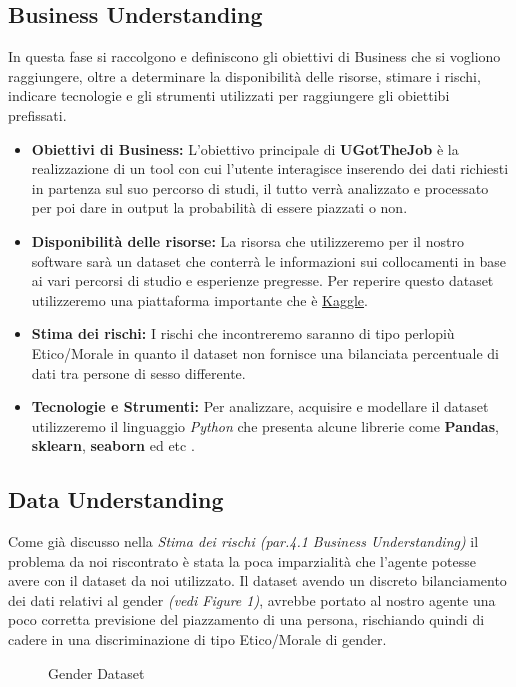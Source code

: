 \documentclass[12pt]{article}
\newcommand{\mainname}{UGotTheJob}
\begin{document}
\newpage

\subsection{Business Understanding}
In questa fase si raccolgono e definiscono gli obiettivi di Business che si vogliono raggiungere, oltre a determinare
la disponibilità delle risorse, stimare i rischi, indicare tecnologie e gli strumenti utilizzati per raggiungere gli obiettibi
prefissati.

\begin{itemize}
    \item \textbf{Obiettivi di Business:} L'obiettivo principale di \textbf{\mainname} è la realizzazione di un tool con cui l'utente interagisce inserendo
          dei dati richiesti in partenza sul suo percorso di studi, il tutto verrà analizzato e processato per poi dare in
          output la probabilità di essere piazzati o non. 

    \item \textbf{Disponibilità delle risorse:} La risorsa che utilizzeremo per il nostro software sarà un dataset che conterrà
          le informazioni sui collocamenti in base ai vari percorsi di studio e esperienze pregresse. Per reperire questo dataset utilizzeremo una piattaforma importante che è \href{https://www.kaggle.com/}{Kaggle}.

    \item \textbf{Stima dei rischi:} I rischi che incontreremo saranno di tipo perlopiù Etico/Morale in quanto il dataset non fornisce una bilanciata percentuale di dati tra persone di
          sesso differente.

    \item \textbf{Tecnologie e Strumenti:} Per analizzare, acquisire e modellare il dataset utilizzeremo il linguaggio \textit{Python} che presenta alcune librerie come \textbf{Pandas}, \textbf{sklearn}, \textbf{seaborn} ed etc .

\end{itemize}

\subsection{Data Understanding}
Come già discusso nella \textit{Stima dei rischi (par.4.1 Business Understanding)} il problema da noi riscontrato è stata la poca imparzialità che l'agente potesse avere
con il dataset da noi utilizzato. Il dataset avendo un discreto bilanciamento dei dati relativi al gender \textit{(vedi Figure 1)}, avrebbe portato al nostro agente una poco
corretta previsione del piazzamento di una persona, rischiando quindi di cadere in una discriminazione di tipo Etico/Morale di gender.
\begin{figure}[ht]
    \centering
    \caption{Gender Dataset}
    \label{fig:torta}
\end{figure}
\end{document}
